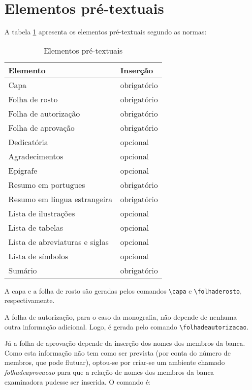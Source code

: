 \documentclass[a4paper,12pt,oneside,onecolumn]{article}
\newcommand{\comando}[1]{\texttt{\textbackslash #1}}
\begin{document}
\section{Elementos pré-textuais}

A tabela \ref{tab:pretextuais} apresenta os elementos pré-textuais segundo as normas:

\begin{table}[h!]
	\centering
	\caption{Elementos pré-textuais}\label{tab:pretextuais}
	\begin{tabular}{l|l}%
		\hline
		Elemento & Inserção\\
		\hline
		Capa & obrigatório\\
		Folha de rosto & obrigatório\\
		Folha de autorização& obrigatório\\
		Folha de aprovação & obrigatório\\
		Dedicatória & opcional\\
		Agradecimentos & opcional\\
		Epígrafe & opcional\\
		Resumo em portugues & obrigatório\\
		Resumo em língua estrangeira & obrigatório\\
		Lista de ilustrações & opcional\\
		Lista de tabelas& opcional\\
		Lista de abreviaturas e siglas & opcional\\
		Lista de símbolos & opcional\\
		Sumário & obrigatório\\
		\hline
	\end{tabular}
\end{table}

A capa e a folha de rosto são geradas pelos comandos \comando{capa} e \comando{folhaderosto}, respectivamente.

A folha de autorização, para o caso da monografia, não depende de nenhuma outra informação adicional. Logo, é gerada pelo comando \comando{folhadeautorizacao}.

Já a folha de aprovação depende da inserção dos nomes dos membros da banca. Como esta informação não tem como ser prevista (por conta do número de membros, que pode flutuar), optou-se por criar-se um ambiente chamado \textsl{folhadeaprovacao} para que a relação de nomes dos membros da banca examinadora pudesse ser inserida. O comando é:\\
\end{document}
